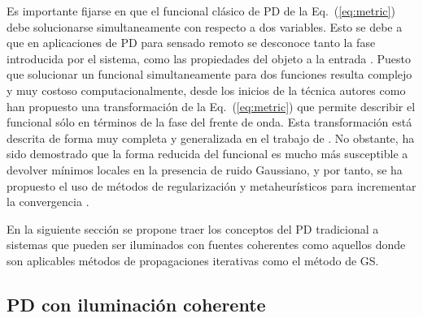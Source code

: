 Es importante fijarse en que el funcional clásico de PD de la
Eq.~(\ref{eq:metric}) debe solucionarse simultaneamente con respecto a
dos variables. Esto se debe a que en aplicaciones de PD para sensado
remoto se desconoce tanto la fase introducida por el sistema, como las
propiedades del objeto a la entrada . Puesto que solucionar un funcional
simultaneamente para dos funciones resulta complejo y muy costoso
computacionalmente, desde los inicios de la técnica autores como
 han propuesto 
una transformación de la Eq.~(\ref{eq:metric}) que permite describir el funcional sólo en términos
de la fase del frente de onda. Esta transformación está descrita
de forma muy completa y generalizada en el trabajo de
.
No obstante, ha sido demostrado que la forma reducida del funcional es
mucho más susceptible a devolver mínimos locales en la presencia de
ruido Gaussiano, y por tanto, se ha propuesto el uso de métodos de
regularización y metaheurísticos para incrementar la convergencia .  

En la siguiente sección se propone traer los conceptos del PD
tradicional a sistemas que pueden ser iluminados con fuentes
coherentes como aquellos donde son aplicables métodos de
propagaciones iterativas como el método de GS.


\subsection{PD con iluminación coherente}
\label{sec:ChPD_PD_il_coherente}


